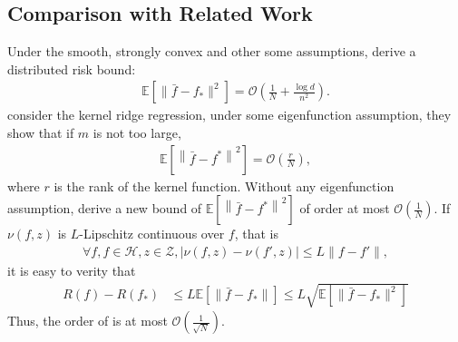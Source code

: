 \documentclass{article}
\begin{document}
\subsection{Comparison with Related Work}
Under the smooth, strongly convex and other some assumptions,
\cite{zhang2012communication} derive a distributed risk bound:
\begin{align}
  \mathbb{E}\left[\|\bar{f}-f_\ast\|^2\right]=\mathcal{O}\left(\frac{1}{N}+\frac{\log d}{n^2}\right).
\end{align}
\cite{Zhang2013} consider the kernel ridge regression,
under some eigenfunction assumption,
they show that if $m$ is not too large,
\begin{align*}
  \mathbb{E}\left[\left\|\bar{f}-f^\ast\right\|^2\right]=\mathcal{O}\left(\frac{r}{N}\right),
\end{align*}
where $r$ is the rank of the kernel function.
Without any eigenfunction assumption,
\cite{lin2017distributed} derive a new bound of $\mathbb{E}\left[\left\|\bar{f}-f^\ast\right\|^2\right]$ of
order at most $\mathcal{O}\left(\frac{1}{N}\right)$.
If $\nu(f,z)$ is $L$-Lipschitz continuous over $f$, that is
\begin{align*}
  \forall f, f\in \mathcal{H}, z\in\mathcal{Z}, |\nu(f,z)-\nu(f',z)|\leq L\|f-f'\|,
\end{align*}
it is easy to verity that
\begin{align}
  \nonumber R(f)-R(f_\ast)&\leq L\mathbb{E}\left[\|\bar{f}-f_\ast\|\right]\leq L\sqrt{\mathbb{E}\left[\|\bar{f}-f_\ast\|^2\right]}
\end{align}
Thus, the order of \cite{zhang2012communication,Zhang2013,lin2017distributed} is at most $\mathcal{O}\left(\frac{1}{\sqrt{N}}\right)$.
\end{document}

